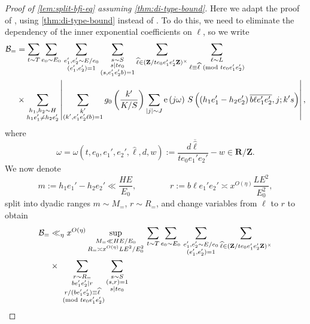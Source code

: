 \documentclass[reqno,11pt]{amsart}
\theoremstyle{definition}
\theoremstyle{remark}
\numberwithin{equation}{section}
\newcommand{\Z}{\mathbf{Z}}
\newcommand{\R}{\mathbf{R}}
\newcommand{\mB}{\mathcal{B}}
\newcommand{\e}{\textnormal{e}}
\renewcommand{\bar}{\overline}
\renewcommand{\hat}{\widehat}
\renewcommand{\pmod}[1]{\ (\textnormal{mod } #1)}
\begin{document}
\begin{proof}[Proof of \cref{lem:split-bfi-eq} assuming \cref{thm:di-type-bound}]
Here we adapt the proof of \cite[Lemma 18.7]{maynard2020primes}, using \cref{thm:di-type-bound} instead of \cite[Theorem 9]{deshouillers1982kloosterman}. To do this, we need to eliminate the dependency of the inner exponential coefficients on $\ell$, so we write
\[
\begin{aligned}
    \mB_= &=
    \sum_{t \sim T} \sum_{e_0 \sim E_0}\,
    \sum_{\substack{e_1', e_2' \sim E/e_0 \\ (e_1', e_2') = 1}}
    \sum_{\substack{s \sim S \\ s \mid te_0 \\ (s, e_1'e_2'b) = 1}}
    \sum_{\hat{\ell} \in (\Z/te_0e_1'e_2'\Z)^\times}
    \sum_{\substack{\ell \sim L \\ \ell \equiv \hat{\ell} \pmod{te_0e_1'e_2'}}} 
    \\
    &\times
    \sum_{\substack{h_1, h_2 \sim H \\ h_1e_1' \neq h_2e_2'}}
    \left\vert 
    \sum_{\substack{k' \\ (k', e_1'e_2'\ell b) = 1}} g_0 \left(\frac{k'}{K/S}\right) 
    \sum_{|j| \sim J}
    \e\left(j \omega \right)\, S\left( (h_1e_1' - h_2e_2')\, \bar{b \ell e_1' e_2'}, j; k's \right)
    \right\vert,
\end{aligned}
\]
where
\[
    \omega = \omega(t, e_0, e_1', e_2', \hat{\ell}, d, w) := \frac{d \bar{\hat{\ell}}}{te_0e_1'e_2'} - w \in \R/\Z.
\]
We now denote
\[
    m := h_1e_1' - h_2e_2' \ll \frac{HE}{E_0},
    \qquad\qquad 
    r := b \ell e_1' e_2' \asymp x^{O(\eta)} \frac{LE^2}{E_0^2},
\]
split into dyadic ranges $m \sim M_=$, $r \sim R_=$, and change variables from $\ell$ to $r$ to obtain
\[
\begin{aligned}
    \mB_= &\ll_\eta x^{O(\eta)}
    \sup_{\substack{M_= \ll HE/E_0 \\ R_= \asymp x^{O(\eta)} LE^2/E_0^2}}\,
    \sum_{t \sim T} \sum_{e_0 \sim E_0}\,
    \sum_{\substack{e_1', e_2' \sim E/e_0 \\ (e_1', e_2') = 1}}
    \sum_{\hat{\ell} \in (\Z/te_0e_1'e_2'\Z)^\times}
    \\
    &\times
    \sum_{\substack{r \sim R_= \\ b e_1'e_2' \mid r \\ r/(be_1'e_2') \equiv \hat{\ell} \\ \pmod{te_0e_1'e_2'}}}
    \sum_{\substack{s \sim S \\ (s, r) = 1 \\ s \mid te_0}}

\end{aligned}\]
\end{proof}
\end{document}
